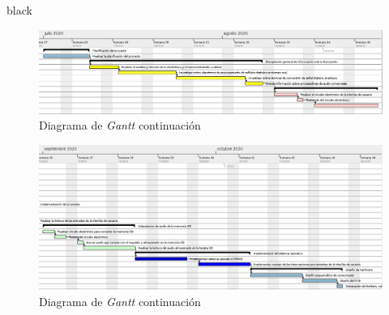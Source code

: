 \documentclass[11pt]{charter}
\begin{document}
\begin{consigna}{black}
\begin{landscape}
\begin{figure}[H]
\centering 
\includegraphics[width=1.5\textwidth]{./Figuras/gant3.png}
\caption{Diagrama de \textit{Gantt} continuación}
\label{fig:gant3}
\end{figure}

\begin{figure}[H]
\centering 
\includegraphics[width=1.5\textwidth]{./Figuras/gant4.png}
\caption{Diagrama de \textit{Gantt} continuación}
\label{fig:gant4}
\end{figure}


\end{landscape}
\end{consigna}
\end{document}
